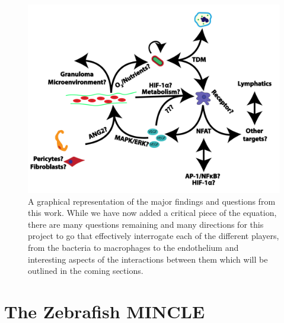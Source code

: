 \begin{figure}
\centering
\includegraphics[width=\textwidth]{images/lingeringquestions.pdf}
\caption{A graphical representation of the major findings and questions from this work. While we have now added a critical piece of the equation, there are many questions remaining and many directions for this project to go that effectively interrogate each of the different players, from the bacteria to macrophages to the endothelium and interesting aspects of the interactions between them which will be outlined in the coming sections.}
\label{figure:lingeringquestions}
\end{figure}

\section{The Zebrafish MINCLE}\label{zfmincle}

